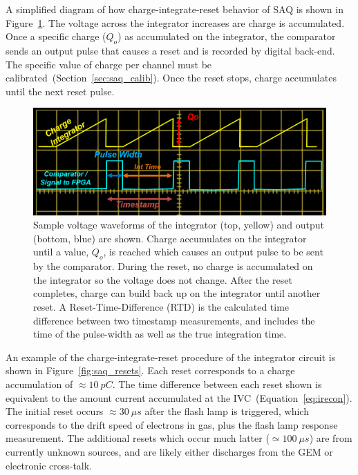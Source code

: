 A simplified diagram of how charge-integrate-reset behavior of SAQ is shown in Figure~\ref{fig:saq_reconstruction}.
The voltage across the integrator increases are charge is accumulated.
Once a specific charge ($Q_{o}$) as accumulated on the integrator, the comparator sends an output pulse that causes a reset and is recorded by digital back-end.
The specific value of charge per channel must be calibrated~(Section~\ref{sec:saq_calib}).
Once the reset stops, charge accumulates until the next reset pulse.

\begin{figure}[]
\centering
\includegraphics[width=\textwidth]{images/saq_example_reconstruction.png}
\caption{Sample voltage waveforms of the integrator (top, yellow) and output (bottom, blue) are shown.
Charge accumulates on the integrator until a value, $Q_{o}$, is reached which causes an output pulse to be sent by the comparator.
During the reset, no charge is accumulated on the integrator so the voltage does not change.
After the reset completes, charge can build back up on the integrator until another reset.
A Reset-Time-Difference (RTD) is the calculated time difference between two timestamp measurements, and includes the time of the pulse-width as well as the true integration time.
}
\label{fig:saq_reconstruction}
\end{figure}

An example of the charge-integrate-reset procedure of the integrator circuit is shown in Figure~\ref{fig:saq_resets}.
Each reset corresponds to a charge accumulation of $\approx 10~\unit{pC}$.
The time difference between each reset shown is equivalent to the amount current accumulated at the IVC~(Equation~\ref{eq:irecon}).
The initial reset occurs $\approx 30~\unit{\mu s}$ after the flash lamp is triggered, which corresponds to the drift speed of electrons in gas, plus the flash lamp response measurement.
The additional resets which occur much latter ($\simeq 100~\unit{\mu s}$) are from currently unknown sources, and are likely either discharges from the GEM or electronic cross-talk.

